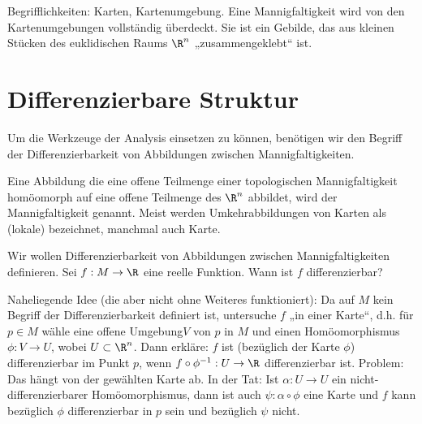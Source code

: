 
Begrifflichkeiten: Karten, Kartenumgebung.
Eine Mannigfaltigkeit wird von den Kartenumgebungen vollständig überdeckt.
Sie ist ein Gebilde, das aus kleinen Stücken des euklidischen Raums $\R^n$ „zusammengeklebt“ ist.


\section{Differenzierbare Struktur}

Um die Werkzeuge der Analysis einsetzen zu können, benötigen wir den Begriff der Differenzierbarkeit von Abbildungen zwischen Mannigfaltigkeiten.

\begin{df} \label{1.5}
    Eine Abbildung die eine offene Teilmenge einer topologischen Mannigfaltigkeit homöomorph auf eine offene Teilmenge des $\R^n$ abbildet, wird  der Mannigfaltigkeit genannt.
    Meist werden Umkehrabbildungen von Karten als (lokale)  bezeichnet, manchmal auch Karte.
\end{df}

Wir wollen Differenzierbarkeit von Abbildungen zwischen Mannigfaltigkeiten definieren.
Sei $f: M \to \R$ eine reelle Funktion.
Wann ist $f$ differenzierbar?

Naheliegende Idee (die aber nicht ohne Weiteres funktioniert):
Da auf $M$ kein Begriff der Differenzierbarkeit definiert ist, untersuche $f$ „in einer Karte“, d.h. für $p \in M$ wähle eine offene Umgebung$V$ von $p$ in $M$ und einen Homöomorphismus $\phi: V \to U$, wobei $U \subset \R^n$.
Dann erkläre: $f$ ist (bezüglich der Karte $\phi$) differenzierbar im Punkt $p$, wenn
\begin{math}
    f \circ \phi^{-1}: U \to \R
\end{math}
differenzierbar ist.
Problem: Das hängt von der gewählten Karte ab.
In der Tat: Ist $\alpha: U \to U$ ein nicht-differenzierbarer Homöomorphismus, dann ist auch $\psi: \alpha \circ \phi$ eine Karte und $f$ kann bezüglich $\phi$ differenzierbar in $p$ sein und bezüglich $\psi$ nicht.


